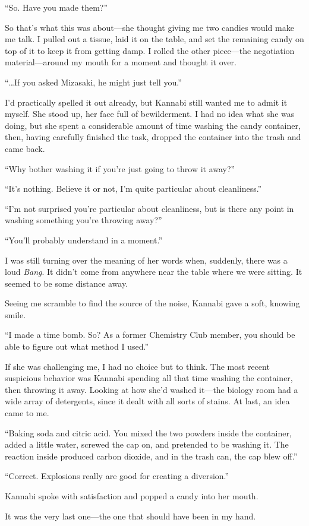 \documentclass[
    a4paper,
    12pt,
    twoside,
    openany,
    UTF8,
    fontset=windows
]{ctexbook}
\begin{document}
``So. Have you made them?''

So that's what this was about---she thought giving me two candies would make me talk. I pulled out a tissue, laid it on the table, and set the remaining candy on top of it to keep it from getting damp. I rolled the other piece---the negotiation material---around my mouth for a moment and thought it over.

``\dots If you asked Mizasaki, he might just tell you.''

I'd practically spelled it out already, but Kannabi still wanted me to admit it myself. She stood up, her face full of bewilderment. I had no idea what she was doing, but she spent a considerable amount of time washing the candy container, then, having carefully finished the task, dropped the container into the trash and came back.

``Why bother washing it if you're just going to throw it away?''

``It's nothing. Believe it or not, I'm quite particular about cleanliness.''

``I'm not surprised you're particular about cleanliness, but is there any point in washing something you're throwing away?''

``You'll probably understand in a moment.''

I was still turning over the meaning of her words when, suddenly, there was a loud \textit{Bang}. It didn't come from anywhere near the table where we were sitting. It seemed to be some distance away.

Seeing me scramble to find the source of the noise, Kannabi gave a soft, knowing smile.

``I made a time bomb. So? As a former Chemistry Club member, you should be able to figure out what method I used.''

If she was challenging me, I had no choice but to think. The most recent suspicious behavior was Kannabi spending all that time washing the container, then throwing it away. Looking at how she'd washed it---the biology room had a wide array of detergents, since it dealt with all sorts of stains. At last, an idea came to me.

``Baking soda and citric acid. You mixed the two powders inside the container, added a little water, screwed the cap on, and pretended to be washing it. The reaction inside produced carbon dioxide, and in the trash can, the cap blew off.''

``Correct. Explosions really are good for creating a diversion.''

Kannabi spoke with satisfaction and popped a candy into her mouth.

It was the very last one---the one that should have been in my hand.
\end{document}
